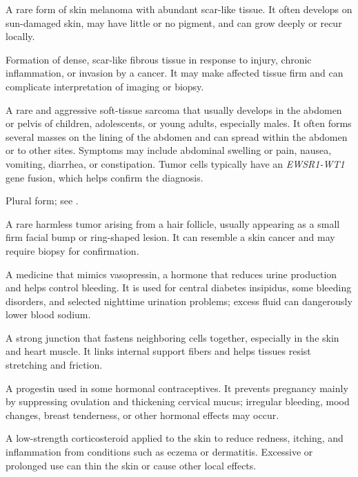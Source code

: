  A rare form of skin melanoma with abundant scar-like tissue. It often develops on sun-damaged skin, may have little or no pigment, and can grow deeply or recur locally.

 Formation of dense, scar-like fibrous tissue in response to injury, chronic inflammation, or invasion by a cancer. It may make affected tissue firm and can complicate interpretation of imaging or biopsy.

 A rare and aggressive soft-tissue sarcoma that usually develops in the abdomen or pelvis of children, adolescents, or young adults, especially males. It often forms several masses on the lining of the abdomen and can spread within the abdomen or to other sites. Symptoms may include abdominal swelling or pain, nausea, vomiting, diarrhea, or constipation. Tumor cells typically have an \textit{EWSR1-WT1} gene fusion, which helps confirm the diagnosis.

 Plural form; see .

 A rare harmless tumor arising from a hair follicle, usually appearing as a small firm facial bump or ring-shaped lesion. It can resemble a skin cancer and may require biopsy for confirmation.

 A medicine that mimics vasopressin, a hormone that reduces urine production and helps control bleeding. It is used for central diabetes insipidus, some bleeding disorders, and selected nighttime urination problems; excess fluid can dangerously lower blood sodium.

 A strong junction that fastens neighboring cells together, especially in the skin and heart muscle. It links internal support fibers and helps tissues resist stretching and friction.

 A progestin used in some hormonal contraceptives. It prevents pregnancy mainly by suppressing ovulation and thickening cervical mucus; irregular bleeding, mood changes, breast tenderness, or other hormonal effects may occur.

 A low-strength corticosteroid applied to the skin to reduce redness, itching, and inflammation from conditions such as eczema or dermatitis. Excessive or prolonged use can thin the skin or cause other local effects.

